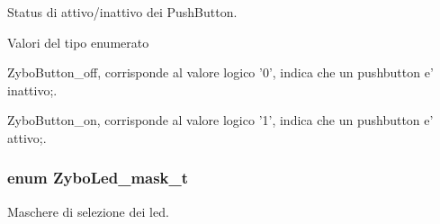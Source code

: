 Status di attivo/inattivo dei Push\+Button. 

\begin{Desc}
\item[Valori del tipo enumerato]\par
\begin{description}
\item[{\em 
\hypertarget{group___zybo_gga85c290bfa232cab213e69200bf78e06aacd110f28912806bcec929721e8737399}{Zybo\+Button\+\_\+off}\label{group___zybo_gga85c290bfa232cab213e69200bf78e06aacd110f28912806bcec929721e8737399}
}]Zybo\+Button\+\_\+off, corrisponde al valore logico '0', indica che un pushbutton e' inattivo;. \item[{\em 
\hypertarget{group___zybo_gga85c290bfa232cab213e69200bf78e06aa49bf4a6902270f28bc6a1146fbd1b1fe}{Zybo\+Button\+\_\+on}\label{group___zybo_gga85c290bfa232cab213e69200bf78e06aa49bf4a6902270f28bc6a1146fbd1b1fe}
}]Zybo\+Button\+\_\+on, corrisponde al valore logico '1', indica che un pushbutton e' attivo;. \end{description}
\end{Desc}
\hypertarget{group___zybo_gad11701cccac394f7e1f90de8f85695f3}{
\subsubsection[{Zybo\+Led\+\_\+mask\+\_\+t}]{\setlength{\rightskip}{0pt plus 5cm}enum {\bf Zybo\+Led\+\_\+mask\+\_\+t}}}\label{group___zybo_gad11701cccac394f7e1f90de8f85695f3}


Maschere di selezione dei led. 

